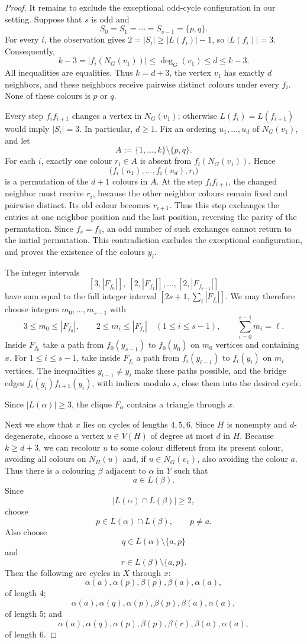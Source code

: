 \documentclass[11pt]{article}
\theoremstyle{remark}
\numberwithin{equation}{section}
\begin{document}
\begin{proof}
It remains to exclude the exceptional odd-cycle configuration in our
setting. Suppose that $s$ is odd and
\[
S_0=S_1=\cdots=S_{s-1}=\{p,q\}.
\]
For every $i$, the observation gives
$2=|S_i|\ge |L(f_i)|-1$, so $|L(f_i)|=3$. Consequently,
\[
k-3=|f_i(N_G(v_1))|\le \deg_G(v_1)\le d\le k-3.
\]
All inequalities are equalities. Thus $k=d+3$, the vertex $v_1$ has
exactly $d$ neighbors, and these neighbors receive pairwise distinct
colours under every $f_i$. None of these colours is $p$ or $q$.

Every step $f_if_{i+1}$ changes a vertex in $N_G(v_1)$; otherwise
$L(f_i)=L(f_{i+1})$ would imply $|S_i|=3$. In particular, $d\ge1$.
Fix an ordering $u_1,\ldots,u_d$ of $N_G(v_1)$, and let
\[
A:=\{1,\ldots,k\}\setminus\{p,q\}.
\]
For each $i$, exactly one colour $r_i\in A$ is absent from
$f_i(N_G(v_1))$. Hence
\[
\bigl(f_i(u_1),\ldots,f_i(u_d),r_i\bigr)
\]
is a permutation of the $d+1$ colours in $A$. At the step
$f_if_{i+1}$, the changed neighbor must receive $r_i$, because the
other neighbor colours remain fixed and pairwise distinct. Its old
colour becomes $r_{i+1}$. Thus this step exchanges the entries at one
neighbor position and the last position, reversing the parity of the
permutation. Since $f_s=f_0$, an odd number of such exchanges cannot
return to the initial permutation. This contradiction excludes the
exceptional configuration, and proves the existence of the colours
$y_i$.

The integer intervals
\[
[3,|F_{f_0}|],\ [2,|F_{f_1}|],\ldots,[2,|F_{f_{s-1}}|]
\]
have sum equal to the full integer interval
$[2s+1,\sum_i |F_{f_i}|]$. We may therefore choose integers
$m_0,\ldots,m_{s-1}$ with
\[
3\le m_0\le |F_{f_0}|,\qquad
2\le m_i\le |F_{f_i}|\quad (1\le i\le s-1),\qquad
\sum_{i=0}^{s-1}m_i=\ell.
\]
Inside $F_{f_0}$ take a path from $f_0(y_{s-1})$ to $f_0(y_0)$ on
$m_0$ vertices and containing $x$. For $1\le i\le s-1$, take inside
$F_{f_i}$ a path from $f_i(y_{i-1})$ to $f_i(y_i)$ on $m_i$ vertices.
The inequalities $y_{i-1}\ne y_i$ make these paths possible, and the
bridge edges $f_i(y_i)f_{i+1}(y_i)$, with indices modulo $s$, close
them into the desired cycle.

\smallskip

Since $|L(\alpha)|\ge3$, the clique $F_\alpha$ contains a triangle
through $x$.

Next we show that $x$ lies on cycles of lengths $4,5,6$.
Since $H$ is nonempty and $d$-degenerate, choose a vertex $u\in V(H)$
of degree at most $d$ in $H$. Because $k\ge d+3$, we can recolour $u$
to some colour different from its present colour, avoiding all colours on
$N_H(u)$ and, if $u\in N_G(v_1)$, also avoiding the colour $a$.
Thus there is a colouring $\beta$ adjacent to $\alpha$ in $Y$ such that
\[
a\in L(\beta).
\]
Since
\[
|L(\alpha)\cap L(\beta)|\ge 2,
\]
choose
\[
p\in L(\alpha)\cap L(\beta),\qquad p\ne a.
\]
Also choose
\[
q\in L(\alpha)\setminus\{a,p\}
\]
and
\[
r\in L(\beta)\setminus\{a,p\}.
\]
Then the following are cycles in $X$ through $x$:
\[
\alpha(a),\alpha(p),\beta(p),\beta(a),\alpha(a),
\]
of length $4$;
\[
\alpha(a),\alpha(q),\alpha(p),\beta(p),\beta(a),\alpha(a),
\]
of length $5$; and
\[
\alpha(a),\alpha(q),\alpha(p),\beta(p),\beta(r),\beta(a),\alpha(a),
\]
of length $6$.


\end{proof}
\end{document}
